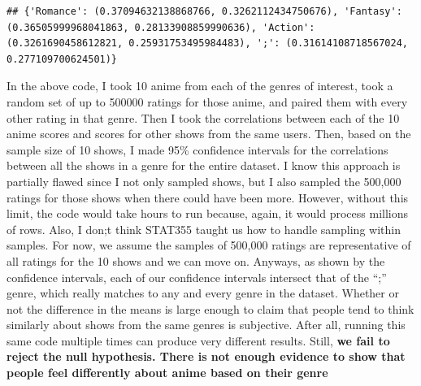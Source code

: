 \documentclass[
]{article}
\begin{document}
\begin{verbatim}
## {'Romance': (0.37094632138868766, 0.3262112434750676), 'Fantasy': (0.36505999968041863, 0.28133908859990636), 'Action': (0.3261690458612821, 0.25931753495984483), ';': (0.31614108718567024, 0.277109700624501)}
\end{verbatim}

In the above code, I took 10 anime from each of the genres of interest,
took a random set of up to 500000 ratings for those anime, and paired
them with every other rating in that genre. Then I took the correlations
between each of the 10 anime scores and scores for other shows from the
same users. Then, based on the sample size of 10 shows, I made 95\%
confidence intervals for the correlations between all the shows in a
genre for the entire dataset. I know this approach is partially flawed
since I not only sampled shows, but I also sampled the 500,000 ratings
for those shows when there could have been more. However, without this
limit, the code would take hours to run because, again, it would process
millions of rows. Also, I don;t think STAT355 taught us how to handle
sampling within samples. For now, we assume the samples of 500,000
ratings are representative of all ratings for the 10 shows and we can
move on. Anyways, as shown by the confidence intervals, each of our
confidence intervals intersect that of the ``;'' genre, which really
matches to any and every genre in the dataset. Whether or not the
difference in the means is large enough to claim that people tend to
think similarly about shows from the same genres is subjective. After
all, running this same code multiple times can produce very different
results. Still, \textbf{we fail to reject the null hypothesis. There is
not enough evidence to show that people feel differently about anime
based on their genre}
\end{document}
